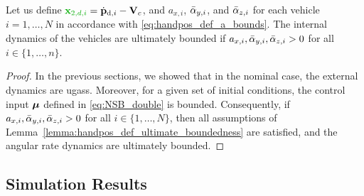\begin{prop}
    \label{prop:angular_velocities}
    Let us define $\dm{\mat{x}_{2, d, i}} = \dot{\mathbf{p}}_{{\rm d}, i} - \ocean$, and $a_{x, i}$, $\Bar{\alpha}_{y, i}$, and $\Bar{\alpha}_{z, i}$ for each vehicle $i = 1, \ldots, N$ in accordance with \eqref{eq:handpos_def_a_bounds}.
    The internal dynamics of the vehicles are ultimately bounded if $a_{x, i}, \Bar{\alpha}_{y, i}, \Bar{\alpha}_{z, i} > 0$ for all $i \in \{1, \ldots, n\}$.
\end{prop}

\begin{proof}
    In the previous sections, we showed that in the nominal case, the external dynamics are \glspl{ugas}.
    Moreover, for a given set of initial conditions, the control input $\bm{\mu}$ defined in \eqref{eq:NSB_double} is bounded.
    Consequently, if $a_{x, i}, \Bar{\alpha}_{y, i}, \Bar{\alpha}_{z, i} > 0$ for all $i \in \{1, \ldots, N\}$, then all assumptions of Lemma~\ref{lemma:handpos_def_ultimate_boundedness} are satisfied, and the angular rate dynamics are ultimately bounded.
\end{proof}

\subsection{Simulation Results}\label{sec:simulation}

